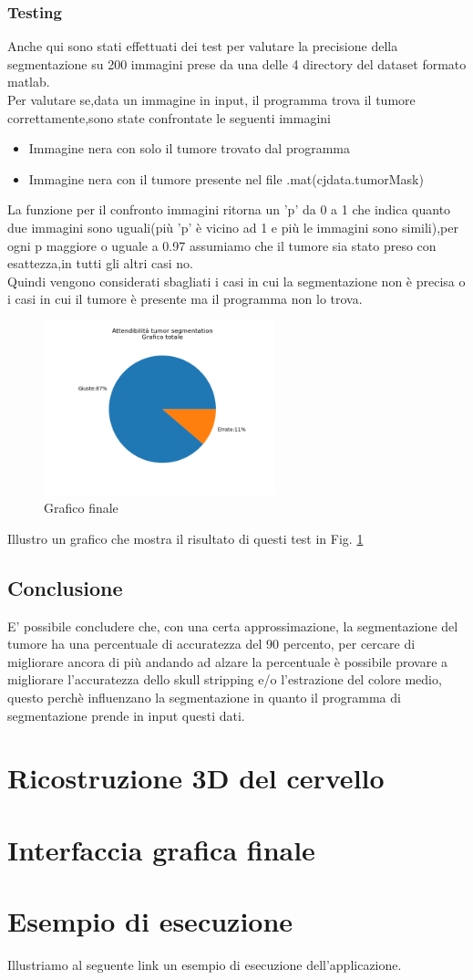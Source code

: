\documentclass{article}
\begin{document}
\subsubsection{Testing}
Anche qui sono stati effettuati dei test per valutare la precisione della segmentazione su 200 immagini prese da una delle 4 directory del dataset formato matlab.\\
Per valutare se,data un immagine in input, il programma trova il tumore correttamente,sono state confrontate le seguenti immagini
\begin{itemize}
    \item Immagine nera con solo il tumore trovato dal programma
    \item Immagine nera con il tumore presente nel file .mat(cjdata.tumorMask)
\end{itemize}
La funzione per il confronto immagini ritorna un 'p' da 0 a 1 che indica quanto due immagini sono uguali(più 'p' è vicino ad 1 e più le immagini sono simili),per ogni p maggiore o uguale a 0.97 assumiamo che il tumore sia stato preso con esattezza,in tutti gli altri casi no.\\
Quindi vengono considerati sbagliati i casi in cui la segmentazione non è precisa o i casi in cui il tumore è presente ma il programma non lo trova.
\begin{figure}
\centering
\includegraphics[width=0.6\textwidth]{ts.png}
\caption{\label{fig:ts} Grafico finale}
\end{figure}
Illustro un grafico che mostra il risultato di questi test in Fig. \ref{fig:ts}
\subsection{Conclusione}
E' possibile concludere che, con una certa approssimazione, la segmentazione del tumore ha una percentuale di accuratezza del 90 percento, per cercare di migliorare ancora di più andando ad alzare la percentuale è possibile provare a migliorare l'accuratezza dello skull stripping e/o l'estrazione del colore medio, questo perchè influenzano la segmentazione in quanto il programma di segmentazione prende in input questi dati.
\section{Ricostruzione 3D del cervello}
\section{Interfaccia grafica finale}
\section{Esempio di esecuzione}
Illustriamo al seguente link un esempio di esecuzione dell'applicazione.
\end{document}

